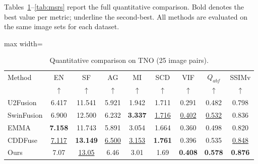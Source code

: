 \documentclass[a4paper,fleqn]{cas-dc}
\begin{document}
Tables~\ref{tab:tno}--\ref{tab:msrs} report the full quantitative
comparison.  Bold denotes the best value per metric; underline the
second-best.  All methods are evaluated on the same image sets for each
dataset.

\begin{table}[htbp]
\centering
\caption{Quantitative comparison on TNO (25 image pairs).}
\label{tab:tno}
\begin{adjustbox}{max width=\columnwidth}
\begin{tabular}{@{}lcccccccc@{}}
\toprule
Method & EN & SF & AG & MI & SCD & VIF & $Q_{abf}$ & SSIMv \\
 & $\uparrow$ & $\uparrow$ & $\uparrow$ & $\uparrow$ & $\uparrow$
 & $\uparrow$ & $\uparrow$ & $\uparrow$ \\
\midrule
U2Fusion\cite{u2fusion2022}
  & 6.417 & 11.541 & 5.921 & 1.942 & 1.711 & 0.291 & 0.482 & 0.798 \\
SwinFusion\cite{swinfusion2022}
  & 6.900 & 12.500 & 6.232 & \textbf{3.337} & \underline{1.716}
  & \underline{0.402} & \underline{0.532} & 0.836 \\
EMMA\cite{emma2024}
  & \textbf{7.158} & 11.743 & 5.891 & 3.054 & 1.664 & 0.360 & 0.498 & 0.820 \\
CDDFuse\cite{cddfuse2023}
  & \underline{7.117} & \textbf{13.149} & \underline{6.500} & \underline{3.153}
  & \textbf{1.761} & 0.396 & 0.535 & \underline{0.848} \\
\midrule
Ours
  & 7.07 & \underline{13.05} & 6.46 & 3.01 & 1.69
  & \textbf{0.408} & \textbf{0.578} & \textbf{0.876} \\
\bottomrule
\end{tabular}
\end{adjustbox}
\end{table}
\end{document}
